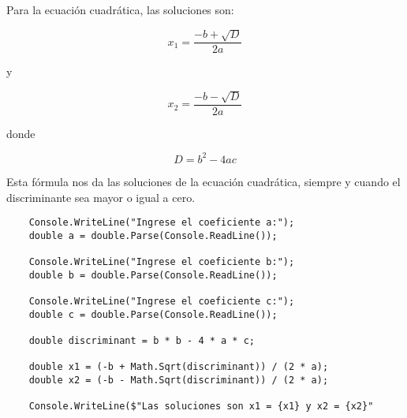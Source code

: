 Para la ecuación cuadrática, las soluciones son:

$$
x_1 = \frac{-b + \sqrt{D}}{2a}
$$

y

$$
x_2 = \frac{-b - \sqrt{D}}{2a}
$$

donde

$$D = b^2 - 4ac$$

Esta fórmula nos da las soluciones de la ecuación cuadrática, siempre y cuando el discriminante sea mayor o igual a cero.

\begin{lstlisting}
    Console.WriteLine("Ingrese el coeficiente a:");
    double a = double.Parse(Console.ReadLine());
    
    Console.WriteLine("Ingrese el coeficiente b:");
    double b = double.Parse(Console.ReadLine());
    
    Console.WriteLine("Ingrese el coeficiente c:");
    double c = double.Parse(Console.ReadLine());
    
    double discriminant = b * b - 4 * a * c;
    
    double x1 = (-b + Math.Sqrt(discriminant)) / (2 * a);
    double x2 = (-b - Math.Sqrt(discriminant)) / (2 * a);
    
    Console.WriteLine($"Las soluciones son x1 = {x1} y x2 = {x2}"
\end{lstlisting}